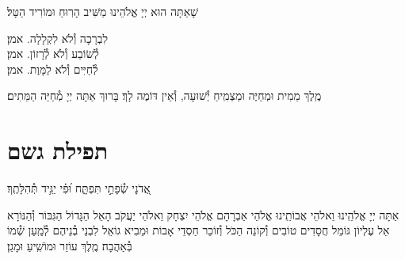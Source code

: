 \documentclass[twoside, openany, parskip=half, 11pt]{book}
\begin{document}
\enlargethispage{\baselineskip}


\begin{large}
שָׁאַתָּה הוּא יְיָ אֱלֹהֵינוּ מַשִּׁיב הָרֽוּחַ וּמוֹרִיד הַטָּל׃

לִבְרָכָה וְ֯לֹא לִקְלָלָה. \hfill אמן׃\\
לְ֯שׂוֹבַע וְ֯לֹא לְ֯רָזוֹן. \hfill אמן׃\\
לְ֯חַיִּים וְ֯לֹא לַמָּוֶת. \hfill אמן׃

\end{large}


מֶֽלֶךְ מֵמִית וּמְחַיֶּה וּמַצְמִֽיחַ יְ֯שׁוּעָה, וְ֯אֵין דּוֹמֶה לָךְ׃ בָּרוּךְ אַתָּה יְיָ מְ֯חַיֵּה הַמֵּתִים׃





\section[תפילת גשם]{ תפילת גשם }

\label{tefilasgeshem}


\begin{small}
אֲ֭דֹנָי שְׂ֯פָתַ֣י תִּפְתָּ֑ח וּ֝פִ֗י יַגִּ֥יד תְּ֯הִלָּתֶֽךָ׃\\
\end{small}
אַתָּה יְיָ אֱלֹהֵֽינוּ וֵאלֹהֵי אֲבוֹתֵֽינוּ אֱלֹהֵי אַבְרָהָם אֱלֹהֵי יִצְחָק וֵאלֹהֵי יַעֲקֹב הָאֵל הַגָּדוֹל הַגִּבּוֹר וְ֯הַנּוֹרָא אֵל עֶלְיוֹן גּוֹמֵל חֲסָדִים טוֹבִים וְ֯קוֹנֵה הַכֹּל וְ֯זוֹכֵר חַסְדֵי אָבוֹת וּמֵבִיא גוֹאֵל לִבְנֵי בְ֯נֵיהֶם לְ֯מַֽעַן שְׁ֯מוֹ בְּ֯אַהֲבָה׃ מֶֽלֶךְ עוֹזֵר וּמוֹשִֽׁיעַ וּמָגֵן׃

\newenvironment{nstabbing}
{\setlength{\topsep}{0pt}%
\setlength{\partopsep}{0pt}%
\tabbing}
{\endtabbing}

\end{document}
